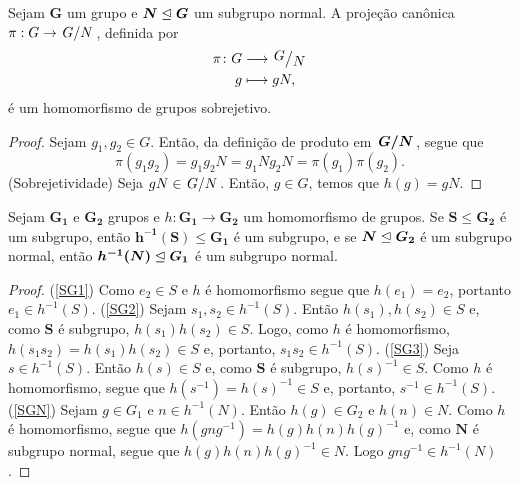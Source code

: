 \begin{proposition}
Sejam $\bm G$ um grupo e $\bm N \mathrel{\unlhd} \bm G$ um subgrupo normal. A projeção canônica $\pi: G \to \quo{G}{N}$, definida por
	\begin{align*}
	\func{\pi}{G}{\quo{G}{N}}{g}{gN},
	\end{align*}
é um homomorfismo de grupos sobrejetivo.
\end{proposition}
\begin{proof}
Sejam $g_1,g_2 \in G$. Então, da definição de produto em $\bm{\quo{G}{N}}$, segue que
	\begin{equation*}
	\pi(g_1g_2) = g_1g_2N = g_1Ng_2N = \pi(g_1)\pi(g_2).
	\end{equation*}
(Sobrejetividade) Seja $gN \in \quo{G}{N}$. Então, $g \in G$, temos que $h(g)=gN$.
\end{proof}

\begin{proposition}
\label{alge:prop.gru.hominv}
Sejam $\bm{G_1}$ e $\bm{G_2}$ grupos e $h: \bm{G_1} \to \bm{G_2}$ um homomorfismo de grupos. Se $\bm S \leq \bm{G_2}$ é um subgrupo, então $\bm{h^{-1}(S)} \leq \bm{G_1}$ é um subgrupo, e se $\bm N \mathrel{\unlhd} \bm{G_2}$ é um subgrupo normal, então $\bm{h^{-1}(N)} \mathrel{\unlhd} \bm{G_1}$ é um subgrupo normal.
\end{proposition}
\begin{proof}
(\ref{SG1}) Como $e_2 \in S$ e $h$ é homomorfismo segue que $h(e_1)=e_2$, portanto $e_1 \in h^{-1}(S)$.
(\ref{SG2}) Sejam $s_1,s_2 \in h^{-1}(S)$. Então $h(s_1),h(s_2) \in S$ e, como $\bm S$ é subgrupo, $h(s_1)h(s_2) \in S$. Logo, como $h$ é homomorfismo, $h(s_1s_2) = h(s_1)h(s_2) \in S$ e, portanto, $s_1s_2 \in h^{-1}(S)$.
(\ref{SG3}) Seja $s \in h^{-1}(S)$. Então $h(s) \in S$ e, como $\bm S$ é subgrupo, $h(s)^{-1} \in S$. Como $h$ é homomorfismo, segue que $h(s^{-1})=h(s)^{-1} \in S$ e, portanto, $s^{-1} \in h^{-1}(S)$.
(\ref{SGN}) Sejam $g \in G_1$ e $n \in h^{-1}(N)$. Então $h(g) \in G_2$ e $h(n) \in N$. Como $h$ é homomorfismo, segue que $h(gng^{-1})=h(g)h(n)h(g)^{-1}$ e, como $\bm N$ é subgrupo normal, segue que $h(g)h(n)h(g)^{-1} \in N$. Logo $gng^{-1} \in h^{-1}(N)$.
\end{proof}

